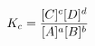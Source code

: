 \documentclass[preview]{standalone}
\begin{document}
\begin{align*}
\special{dvisvgm:raw <g id='unique000'>}K_c = \frac{[C]^c[D]^d}{[A]^a[B]^b}\special{dvisvgm:raw </g>}
\end{align*}
\end{document}
